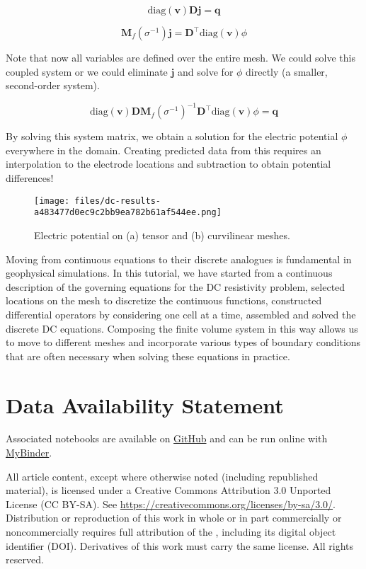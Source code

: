 \documentclass[Journal,InsideFigs,DoubleSpace,12pt,letterpaper]{ascelike-new}
\begin{document}
\begin{equation}
\text{diag}(\mathbf{v}) \mathbf{D}\mathbf{j} = \mathbf{q}
\end{equation}

\begin{equation}
\mathbf{M}_f(\sigma^{-1}) \mathbf{j} = \mathbf{D}^\top \text{diag}(\mathbf{v})\phi
\end{equation}

Note that now all variables are defined over the entire mesh. We could solve this coupled system or we could eliminate $\mathbf{j}$ and solve for $\phi$ directly (a smaller, second-order system).

\begin{equation}
\text{diag}({\mathbf{v}}) \mathbf{D}\mathbf{M}_f(\sigma^{-1})^{-1}\mathbf{D}^\top\text{diag}({\mathbf{v}})\phi = \mathbf{q}
\end{equation}

By solving this system matrix, we obtain a solution for the electric potential $\phi$ everywhere in the domain. Creating predicted data from this requires an interpolation to the electrode locations and subtraction to obtain potential differences!

\begin{figure}[!htbp]
\centering
\texttt{[image: files/dc-results-a483477d0ec9c2bb9ea782b61af544ee.png]}
\caption{Electric potential on (a) tensor and (b) curvilinear meshes.}
\label{fig-results}
\end{figure}

Moving from continuous equations to their discrete analogues is fundamental in geophysical simulations. In this tutorial, we have started from a continuous description of the governing equations for the DC resistivity problem, selected locations on the mesh to discretize the continuous functions, constructed differential operators by considering one cell at a time, assembled and solved the discrete DC equations. Composing the finite volume system in this way allows us to move to different meshes and incorporate various types of boundary conditions that are often necessary when solving these equations in practice.

\section*{Data Availability Statement}
Associated notebooks are available on \href{https://github.com/simpeg/tle-finitevolume}{GitHub} and can be run online with \href{http://mybinder.org/repo/simpeg/tle-finitevolume}{MyBinder}.


All article content, except where otherwise noted (including republished material), is licensed under a Creative Commons Attribution 3.0 Unported License (CC BY-SA). See \href{https://creativecommons.org/licenses/by-sa/3.0/}{https://creativecommons.org/licenses/by-sa/3.0/}. Distribution or reproduction of this work in whole or in part commercially or noncommercially requires full attribution of the \cite{Cockett_2016}, including its digital object identifier (DOI). Derivatives of this work must carry the same license. All rights reserved.


\end{document}
